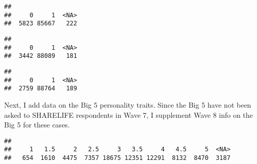 \documentclass[
]{article}
\newenvironment{Shaded}{\begin{snugshade}}{\end{snugshade}}
\newcommand{\AttributeTok}[1]{\textcolor[rgb]{0.77,0.63,0.00}{#1}}
\newcommand{\CommentTok}[1]{\textcolor[rgb]{0.56,0.35,0.01}{\textit{#1}}}
\newcommand{\FunctionTok}[1]{\textcolor[rgb]{0.00,0.00,0.00}{#1}}
\newcommand{\NormalTok}[1]{#1}
\newcommand{\OtherTok}[1]{\textcolor[rgb]{0.56,0.35,0.01}{#1}}
\newcommand{\SpecialCharTok}[1]{\textcolor[rgb]{0.00,0.00,0.00}{#1}}
\newcommand{\StringTok}[1]{\textcolor[rgb]{0.31,0.60,0.02}{#1}}
\begin{document}
\begin{verbatim}
## 
##     0     1  <NA> 
##  5823 85667   222
\end{verbatim}

\begin{Shaded}
\end{Shaded}

\begin{verbatim}
## 
##     0     1  <NA> 
##  3442 88089   181
\end{verbatim}

\begin{Shaded}
\end{Shaded}

\begin{verbatim}
## 
##     0     1  <NA> 
##  2759 88764   189
\end{verbatim}

Next, I add data on the Big 5 personality traits. Since the Big 5 have
not been asked to SHARELIFE respondents in Wave 7, I supplement Wave 8
info on the Big 5 for these cases.

\begin{Shaded}
\end{Shaded}

\begin{verbatim}
## 
##     1   1.5     2   2.5     3   3.5     4   4.5     5  <NA> 
##   654  1610  4475  7357 18675 12351 12291  8132  8470  3187
\end{verbatim}

\begin{Shaded}
\end{Shaded}
\end{document}

